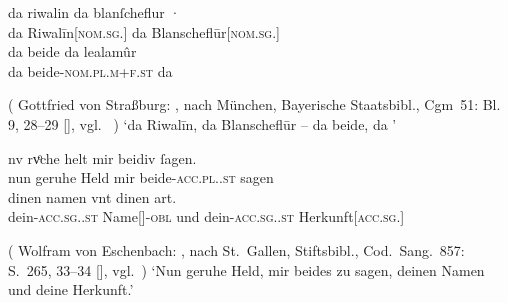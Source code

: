 \begin{exe}
\ex \label{ex:askedal73pr}
	\begin{xlist}
	\ex \label{ex:askedal73pr_1}
		\gll da riwalin da {blanſcheflur ·} \\
			da Riwalīn[\textsc{nom.sg.\MascM}] da
				Blanscheflūr[\textsc{nom.sg.\FemF}] \\
	\sn \gll da beide da lealamûr \\
			da beide-\textsc{nom.pl.m+f\subMF.st} da  \\
		\begin{taggedline}{(%
				Gottfried von Straßburg: ,
				nach München, Bayerische Staatsbibl., Cgm~51: Bl. 9, 28--29
				[\cite[1286]{hsc}],
				vgl.~\cite[22~{[=~V.~1359--1360]}]{maroldschroeder1969}%
			)}
		\trans `da Riwalīn, da Blanscheflūr -- da beide, da '
		\end{taggedline}

	\ex \label{ex:askedal73pr_2}
		\gll nv rvͦche helt mir beidiv ſagen. \\
			nun geruhe Held mir beide-\textsc{acc.pl.\NeutI.st} sagen \\
	\sn \gll dinen namen vnt dinen art. \\
			dein-\textsc{acc.sg.\MascI.st} Name[\textsc{\MascI}]-\textsc{obl}
			und dein-\textsc{acc.sg.\MascI.st}
			Herkunft[\textsc{acc.sg.\MascI}] \\
		\begin{taggedline}{(%
				Wolfram von Eschenbach: \tit{Parzival},
				nach St.~Gallen, Stiftsbibl., Cod.~Sang.~857: S.~265\tsup{a}, 33--34
				[\cite[1211]{hsc}],
				vgl.~\cite[749~{[=~745.18--19]}]{knechtschirok2003})}
		\trans `Nun geruhe Held, mir beides zu sagen, deinen Namen und
			deine Herkunft.'\footnotemark
		\end{taggedline}
	\end{xlist}
\end{exe}
%

